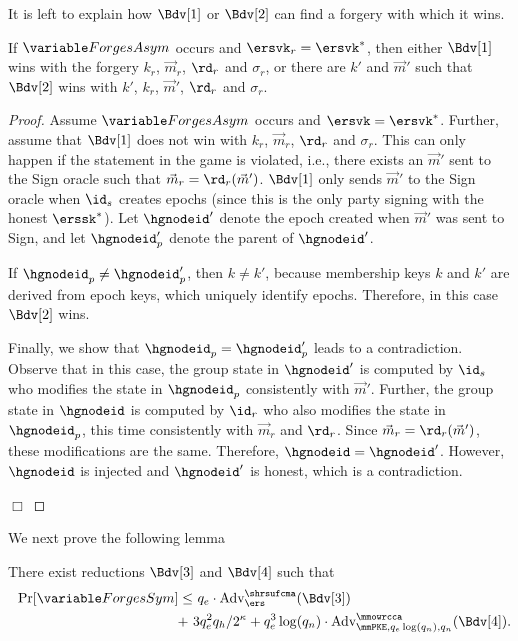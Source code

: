 It is left to explain how $\Bdv[1]$ or $\Bdv[2]$ can find a forgery with which it wins.
\begin{claim}
  If $\forgesa$ occurs and $\ersvk_r=\ersvk^*$, then either $\Bdv[1]$ wins with the forgery $k_r$, $\vec m_r$, $\rd_r$ and $\sigma_r$, or there are $k'$ and $\vec m'$ such that $\Bdv[2]$ wins with $k'$, $k_r$, $\vec m'$, $\rd_r$ and $\sigma_r$.
\end{claim}
\begin{proof}
  Assume $\forgesa$ occurs and $\ersvk=\ersvk^*$. Further, assume that $\Bdv[1]$ does not win with $k_r$, $\vec m_r$, $\rd_r$ and $\sigma_r$.
  This can only happen if the \KwReq{} statement in the \ahrsufcma game is violated, i.e., there exists an $\vec m'$ sent to the Sign oracle such that $\vec m_r = \rd_r(\vec m')$. $\Bdv[1]$ only sends $\vec m'$ to the Sign oracle when $\id_s$ creates epochs (since this is the only party signing with the honest $\erssk^*$). Let $\hgnodeid'$ denote the epoch created when $\vec m'$ was sent to Sign, and let $\hgnodeid_p'$ denote the parent of $\hgnodeid'$.

  If $\hgnodeid_p \neq \hgnodeid_p'$, then $k \neq k'$, because membership keys $k$ and $k'$ are derived from epoch keys, which uniquely identify epochs. Therefore, in this case $\Bdv[2]$ wins.

  Finally, we show that $\hgnodeid_p = \hgnodeid_p'$ leads to a contradiction. Observe that in this case, the group state in $\hgnodeid'$ is computed by $\id_s$ who modifies the state in $\hgnodeid_p$ consistently with $\vec m'$. Further, the group state in $\hgnodeid$ is computed by $\id_r$ who also modifies the state in $\hgnodeid_p$, this time consistently with $\vec m_r$ and $\rd_r$. Since $\vec m_r=\rd_r(\vec m')$, these modifications are the same. Therefore, $\hgnodeid=\hgnodeid'$. However, $\hgnodeid$ is injected and $\hgnodeid'$ is honest, which is a contradiction.
\strut\hfill$\Box$\end{proof}


We next prove the following lemma
\begin{lemma}
There exist reductions $\Bdv[3]$ and $\Bdv[4]$ such that
\begin{equation*}
  \begin{split}
    \Pr[\forgess] \leq &\  q_e\cdot \textnormal{Adv}^{\shrsufcma}_\ers(\Bdv[3]) \\+\ & 3q_e^2q_h/2^\kappa + q_e^3\log(q_n)\cdot \textnormal{Adv}^\mmowrcca_{\mmPKE,q_e\log(q_n),q_n}(\Bdv[4]).
  \end{split}
\end{equation*}
\end{lemma}

